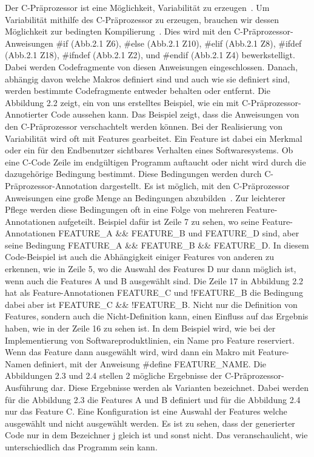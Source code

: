 Der C-Präprozessor ist eine Möglichkeit, Variabilität zu erzeugen~\cite{ABKS13}. Um Variabilität mithilfe des C-Präprozessor zu erzeugen, brauchen wir dessen Möglichkeit zur bedingten Kompilierung~\cite{ABKS13}. Dies wird mit den C-Präprozessor-Anweisungen \#if (Abb.2.1 Z6), \#else (Abb.2.1 Z10), \#elif (Abb.2.1 Z8), \#ifdef (Abb.2.1 Z18), \#ifndef (Abb.2.1 Z2), und \#endif (Abb.2.1 Z4) bewerkstelligt. Dabei werden Codefragmente von diesen Anweisungen eingeschlossen. Danach, abhängig davon welche Makros definiert sind und auch wie sie definiert sind, werden bestimmte Codefragmente entweder behalten oder entfernt. Die Abbildung 2.2 zeigt, ein von uns erstelltes Beispiel, wie ein mit C-Präprozessor-Annotierter Code aussehen kann. Das Beispiel zeigt, dass die Anweisungen von den C-Präprozessor verschachtelt werden können. Bei der Realisierung von Variabilität wird oft mit Features gearbeitet. Ein Feature ist dabei ein Merkmal oder ein für den Endbenutzer sichtbares Verhalten eines Softwaresystems. Ob eine C-Code Zeile im endgültigen Programm auftaucht oder nicht wird durch die dazugehörige Bedingung bestimmt. Diese Bedingungen werden durch C-Präprozessor-Annotation dargestellt. Es ist möglich, mit den C-Präprozessor Anweisungen  eine große Menge an Bedingungen abzubilden~\cite{BTS+:ESECFSE22}. Zur leichterer Pflege werden diese Bedingungen oft in eine Folge von mehreren Feature-Annotationen aufgeteilt. Beispiel dafür ist Zeile 7 zu sehen, wo seine Feature-Annotationen FEATURE\_A \&\& FEATURE\_B und FEATURE\_D sind, aber seine Bedingung FEATURE\_A \&\& FEATURE\_B \&\& FEATURE\_D. In diesem Code-Beispiel ist auch die Abhängigkeit einiger Features von anderen zu erkennen, wie in Zeile 5, wo die Auswahl des Features D nur dann möglich ist, wenn auch die Features A und B ausgewählt sind. Die Zeile 17 in Abbildung 2.2 hat als Feature-Annotationen FEATURE\_C und !FEATURE\_B die Bedingung dabei aber ist FEATURE\_C \&\& !FEATURE\_B. Nicht nur die Definition von Features, sondern auch die Nicht-Definition kann, einen Einfluss auf das Ergebnis haben, wie in der Zeile 16 zu sehen ist. In dem Beispiel wird, wie bei der Implementierung von Softwareproduktlinien, ein Name pro Feature reserviert. Wenn das Feature dann ausgewählt wird, wird dann ein Makro mit Feature-Namen definiert, mit der Anweisung \#define FEATURE\_NAME. Die Abbildungen 2.3 und 2.4 stellen 2 mögliche Ergebnisse der C-Präprozessor-Ausführung dar. Diese Ergebnisse werden als Varianten bezeichnet. Dabei werden für die Abbildung 2.3 die Features A und B definiert und für die Abbildung 2.4 nur das Feature C. Eine Konfiguration ist eine Auswahl der Features welche ausgewählt und nicht ausgewählt werden. Es ist zu sehen, dass der generierter Code nur in dem Bezeichner j gleich ist und sonst nicht. Das veranschaulicht, wie unterschiedlich das Programm sein kann.
